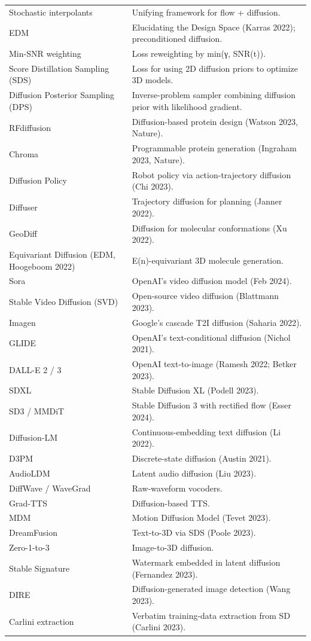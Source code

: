 {\begin{longtable}[]{@{}
  >{\raggedright\arraybackslash}p{}
  >{\raggedright\arraybackslash}p{}@{}}
Stochastic interpolants & Unifying framework for flow + diffusion. \\
EDM & Elucidating the Design Space (Karras 2022); preconditioned diffusion. \\
Min-SNR weighting & Loss reweighting by min(γ, SNR(t)). \\
Score Distillation Sampling (SDS) & Loss for using 2D diffusion priors to optimize 3D models. \\
Diffusion Posterior Sampling (DPS) & Inverse-problem sampler combining diffusion prior with likelihood gradient. \\
RFdiffusion & Diffusion-based protein design (Watson 2023, Nature). \\
Chroma & Programmable protein generation (Ingraham 2023, Nature). \\
Diffusion Policy & Robot policy via action-trajectory diffusion (Chi 2023). \\
Diffuser & Trajectory diffusion for planning (Janner 2022). \\
GeoDiff & Diffusion for molecular conformations (Xu 2022). \\
Equivariant Diffusion (EDM, Hoogeboom 2022) & E(n)-equivariant 3D molecule generation. \\
Sora & OpenAI's video diffusion model (Feb 2024). \\
Stable Video Diffusion (SVD) & Open-source video diffusion (Blattmann 2023). \\
Imagen & Google's cascade T2I diffusion (Saharia 2022). \\
GLIDE & OpenAI's text-conditional diffusion (Nichol 2021). \\
DALL-E 2 / 3 & OpenAI text-to-image (Ramesh 2022; Betker 2023). \\
SDXL & Stable Diffusion XL (Podell 2023). \\
SD3 / MMDiT & Stable Diffusion 3 with rectified flow (Esser 2024). \\
Diffusion-LM & Continuous-embedding text diffusion (Li 2022). \\
D3PM & Discrete-state diffusion (Austin 2021). \\
AudioLDM & Latent audio diffusion (Liu 2023). \\
DiffWave / WaveGrad & Raw-waveform vocoders. \\
Grad-TTS & Diffusion-based TTS. \\
MDM & Motion Diffusion Model (Tevet 2023). \\
DreamFusion & Text-to-3D via SDS (Poole 2023). \\
Zero-1-to-3 & Image-to-3D diffusion. \\
Stable Signature & Watermark embedded in latent diffusion (Fernandez 2023). \\
DIRE & Diffusion-generated image detection (Wang 2023). \\
Carlini extraction & Verbatim training-data extraction from SD (Carlini 2023). \\
\end{longtable}
}

